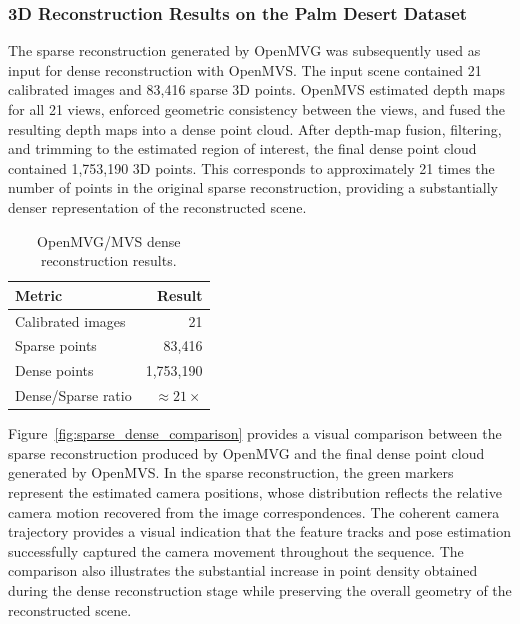\subsubsection{3D Reconstruction Results on the Palm Desert Dataset}
\label{sec:palm_desert_reconstruction_results}

The sparse reconstruction generated by OpenMVG was subsequently used as
input for dense reconstruction with OpenMVS. The input scene contained
21 calibrated images and 83,416 sparse 3D points. OpenMVS estimated
depth maps for all 21 views, enforced geometric consistency between
the views, and fused the resulting depth maps into a dense point cloud.
After depth-map fusion, filtering, and trimming to the estimated region
of interest, the final dense point cloud contained 1,753,190 3D points.
This corresponds to approximately 21 times the number of points in the
original sparse reconstruction, providing a substantially denser
representation of the reconstructed scene.

\begin{table}[H]
    \centering
    \caption{OpenMVG/MVS dense reconstruction results.}
    \label{tab:openmvs_dense_results}
    \begin{tabular}{lr}
        \hline
        \textbf{Metric} & \textbf{Result} \\
        \hline
        Calibrated images & 21 \\
        Sparse points & 83,416 \\
        Dense points & 1,753,190 \\
        Dense/Sparse ratio & $\approx 21\times$ \\
        \hline
    \end{tabular}
\end{table}

Figure~\ref{fig:sparse_dense_comparison} provides a visual comparison
between the sparse reconstruction produced by OpenMVG and the final
dense point cloud generated by OpenMVS. In the sparse reconstruction,
the green markers represent the estimated camera positions, whose
distribution reflects the relative camera motion recovered from the
image correspondences. The coherent camera trajectory provides a
visual indication that the feature tracks and pose estimation successfully
captured the camera movement throughout the sequence. The comparison
also illustrates the substantial increase in point density obtained
during the dense reconstruction stage while preserving the overall
geometry of the reconstructed scene.

